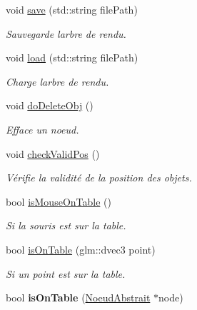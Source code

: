 \begin{DoxyCompactItemize}
void \hyperlink{group__inf2990_ga32032b986fdb830fb158dbd354aa55e7}{save} (std\+::string file\+Path)
\begin{DoxyCompactList}\small\item\em Sauvegarde l\textquotesingle{}arbre de rendu. \end{DoxyCompactList}\item 
void \hyperlink{group__inf2990_ga4a34752db2d5c26cf97baca584c27dec}{load} (std\+::string file\+Path)
\begin{DoxyCompactList}\small\item\em Charge l\textquotesingle{}arbre de rendu. \end{DoxyCompactList}\item 
void \hyperlink{group__inf2990_gaa41bbec7d5381099ca3b945b6ed2675f}{do\+Delete\+Obj} ()
\begin{DoxyCompactList}\small\item\em Efface un noeud. \end{DoxyCompactList}\item 
void \hyperlink{group__inf2990_ga612cbe4c05f2e8adfb632db4fb1a3cf0}{check\+Valid\+Pos} ()
\begin{DoxyCompactList}\small\item\em Vérifie la validité de la position des objets. \end{DoxyCompactList}\item 
bool \hyperlink{group__inf2990_gaaaa7ff115548c42faa0570a3c7c4648e}{is\+Mouse\+On\+Table} ()
\begin{DoxyCompactList}\small\item\em Si la souris est sur la table. \end{DoxyCompactList}\item 
\hypertarget{group__inf2990_ga58f9c6d2f80118bcdf95e1967a455bea}{}bool \hyperlink{group__inf2990_ga58f9c6d2f80118bcdf95e1967a455bea}{is\+On\+Table} (glm\+::dvec3 point)\label{group__inf2990_ga58f9c6d2f80118bcdf95e1967a455bea}

\begin{DoxyCompactList}\small\item\em Si un point est sur la table. \end{DoxyCompactList}\item 
\hypertarget{group__inf2990_ga842a9426f91665baed35ec654cec6a20}{}bool {\bfseries is\+On\+Table} (\hyperlink{class_noeud_abstrait}{Noeud\+Abstrait} $\ast$node)\label{group__inf2990_ga842a9426f91665baed35ec654cec6a20}


\end{DoxyCompactItemize}
